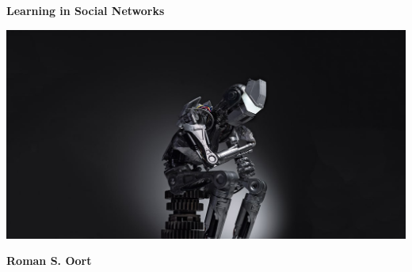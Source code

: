 \documentclass[a4paper, 12pt]{report}
\newcommand{\theTitle}{Learning in Social Networks}
\newcommand{\theAuthor}{Roman S. Oort}
\begin{document}




    \thispagestyle{empty}
    
    \pagecolor{black}\afterpage{\nopagecolor}
 
    \begin{minipage}[t][0.8\paperheight]{0.8\paperwidth}
        \begin{center}
        
                  {\color{white} \fontsize{52}{104}\selectfont \textbf{\theTitle} }
               
                  \vspace{0.2\paperheight}
                  
                 
                  \includegraphics[width=0.75\paperwidth]{ThesisKI/UvAThesisLayout/augmented-intelligence.jpeg}
                  
                  \vspace{0.2\paperheight}
                  
                 {\color{white} \fontsize{24}{48}\selectfont \textbf{\theAuthor} }
        \end{center}
    \end{minipage}   
   
\end{document}
